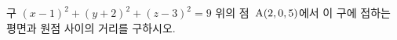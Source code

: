 구 $(x-1)^2+(y+2)^2+(z-3)^2=9$ 위의 점~$\mathrm{A}(2{,}\mkern3mu\mathopen{}0{,}\mkern3mu\mathopen{}5)$에서 이 구에 접하는 평면과 원점 사이의 거리를 구하시오.
